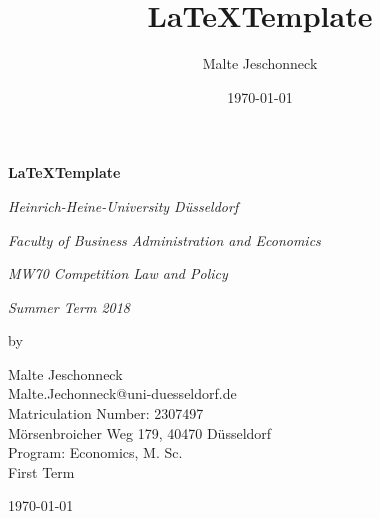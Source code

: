 \documentclass[a4paper]{scrartcl}
\begin{document}
	\title{\LaTeX Template}
	\author{Malte Jeschonneck}
	\date{\today}
	\maketitle
	
	\newpage
	
	\begin{titlepage}
		\centering
		\vspace{1cm}
		{\Large\bfseries \LaTeX Template \par}
		\vspace{4cm}
		{\large\itshape Heinrich-Heine-University Düsseldorf\par}
		\vspace{0.5cm}
		{\large\itshape Faculty of Business Administration and Economics\par}
		\vspace{0.5cm}
		{\large\itshape MW70 Competition Law and Policy\par}
		\vspace{0.5cm}
		{\large\itshape Summer Term 2018\par}
		{\large\itshape \par}
		\vfill
		by\par
		\vspace{0.5cm}
		Malte Jeschonneck\\
		Malte.Jechonneck@uni-duesseldorf.de\\
		Matriculation Number: 2307497\\
		Mörsenbroicher Weg 179, 40470 Düsseldorf\\
		Program: Economics, M. Sc.\\
		First Term
		
		
		\vfill
		
		{\large \today\par}
	\end{titlepage}

\newpage
	
	
	\tableofcontents
	\newpage
	\listoffigures
	\newpage
	\listoftables
	\newpage
	
	
	
	
	
	
	
	
	
	
	
	
	
	
	
\end{document}
